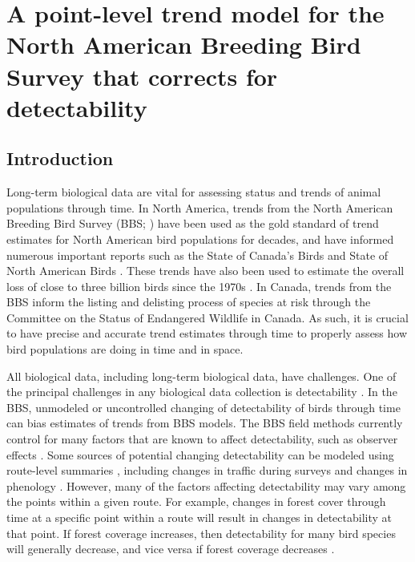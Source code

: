 \chapter{A point-level trend model for the North American Breeding Bird Survey that corrects for detectability}


\section{Introduction}

\par Long-term biological data are vital for assessing status and trends of animal populations through time.
In North America, trends from the North American Breeding Bird Survey (BBS; \citet{sauer_first_2017, hudson_role_2017}) have been used as the gold standard of trend estimates for North American bird populations for decades, and have informed numerous important reports such as the State of Canada's Birds \citep{north_american_bird_conservation_initiative_canada_state_2019} and State of North American Birds \citep{north_american_bird_conservation_initiative_canada_state_2022}.
These trends have also been used to estimate the overall loss of close to three billion birds since the 1970s \citep{rosenberg_decline_2019}.
In Canada, trends from the BBS inform the listing and delisting process of species at risk through the Committee on the Status of Endangered Wildlife in Canada.
As such, it is crucial to have precise and accurate trend estimates through time to properly assess how bird populations are doing in time and in space.

\par All biological data, including long-term biological data, have challenges.
One of the principal challenges in any biological data collection is detectability \citep{bennett_how_2024}.
In the BBS, unmodeled or uncontrolled changing of detectability of birds through time can bias estimates of trends from BBS models.
The BBS field methods currently control for many factors that are known to affect detectability, such as observer effects \citet{sauer_observer_1994}.
Some sources of potential changing detectability can be modeled using route-level summaries \cite{smith_patterns_2023}, including changes in traffic during surveys \citep{griffith_traffic_2010} and changes in phenology \citep{english_current_2021}.
However, many of the factors affecting detectability may vary among the points within a given route.
For example, changes in forest cover through time at a specific point within a route will result in changes in detectability at that point.
If forest coverage increases, then detectability for many bird species will generally decrease, and vice versa if forest coverage decreases \citep{edwards_point_2023, yip_sound_2017}.


